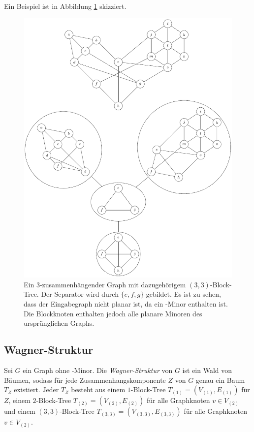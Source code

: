 Ein Beispiel ist in Abbildung \ref{fig:33-Block-Tree} skizziert.
\begin{figure}[H]
  \centering
  \includegraphics[width=\textwidth,height=\textheight,keepaspectratio]{bilder/33-Block-Tree.pdf}
  \caption{Ein $3$-zusammenhängender Graph mit dazugehörigem $(3, 3)$-Block-Tree.
           Der Separator wird durch $\{e, f, g\}$ gebildet.
           Es ist zu sehen, dass der Eingabegraph nicht planar ist, da ein \kdd-Minor enthalten ist.
           Die Blockknoten enthalten jedoch alle planare Minoren des ursprünglichen Graphs.}
  \label{fig:33-Block-Tree}
\end{figure}


\subsection{Wagner-Struktur}
\begin{definition}\label{eq:WagnerStruktur}
  Sei $G$ ein Graph ohne \kf-Minor.
  Die \emph{Wagner-Struktur} von $G$ ist ein Wald von Bäumen, sodass für jede Zusammenhangskomponente $Z$ von $G$ genau ein Baum $T_Z$ existiert.
  Jeder $T_Z$ besteht aus einem $1$-Block-Tree $T_{(1)} = (V_{(1)}, E_{(1)})$ für $Z$, einem $2$-Block-Tree $T_{(2)} = (V_{(2)}, E_{(2)})$ für alle Graphknoten $v \in V_{(2)}$ und einem $(3, 3)$-Block-Tree $T_{(3, 3)} = (V_{(3, 3)}, E_{(3, 3)})$ für alle Graphknoten $v \in V_{(2)}$\cite{ReL}.
\end{definition}

